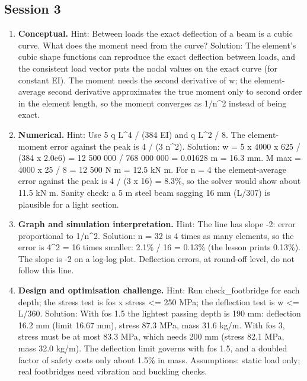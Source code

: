 \documentclass[11pt,a4paper]{article}
\begin{document}
\subsection*{Session 3}
\begin{enumerate}[nosep]
\item \textbf{Conceptual.} Hint: Between loads the exact deflection of a beam is a cubic curve. What does the moment need from the curve? Solution: The element's cubic shape functions can reproduce the exact deflection between loads, and the consistent load vector puts the nodal values on the exact curve (for constant EI). The moment needs the second derivative of w; the element-average second derivative approximates the true moment only to second order in the element length, so the moment converges as 1/n\textasciicircum{}2 instead of being exact.
\item \textbf{Numerical.} Hint: Use 5 q L\textasciicircum{}4 / (384 EI) and q L\textasciicircum{}2 / 8. The element-moment error against the peak is 4 / (3 n\textasciicircum{}2). Solution: w = 5 x 4000 x 625 / (384 x 2.0e6) = 12 500 000 / 768 000 000 = 0.01628 m = 16.3 mm. M max = 4000 x 25 / 8 = 12 500 N m = 12.5 kN m. For n = 4 the element-average error against the peak is 4 / (3 x 16) = 8.3\%, so the solver would show about 11.5 kN m. Sanity check: a 5 m steel beam sagging 16 mm (L/307) is plausible for a light section.
\item \textbf{Graph and simulation interpretation.} Hint: The line has slope -2: error proportional to 1/n\textasciicircum{}2. Solution: n = 32 is 4 times as many elements, so the error is 4\textasciicircum{}2 = 16 times smaller: 2.1\% / 16 = 0.13\% (the lesson prints 0.13\%). The slope is -2 on a log-log plot. Deflection errors, at round-off level, do not follow this line.
\item \textbf{Design and optimisation challenge.} Hint: Run check\_footbridge for each depth; the stress test is fos x stress \textless{}= 250 MPa; the deflection test is w \textless{}= L/360. Solution: With fos 1.5 the lightest passing depth is 190 mm: deflection 16.2 mm (limit 16.67 mm), stress 87.3 MPa, mass 31.6 kg/m. With fos 3, stress must be at most 83.3 MPa, which needs 200 mm (stress 82.1 MPa, mass 32.0 kg/m). The deflection limit governs with fos 1.5, and a doubled factor of safety costs only about 1.5\% in mass. Assumptions: static load only; real footbridges need vibration and buckling checks.
\end{enumerate}
\end{document}
